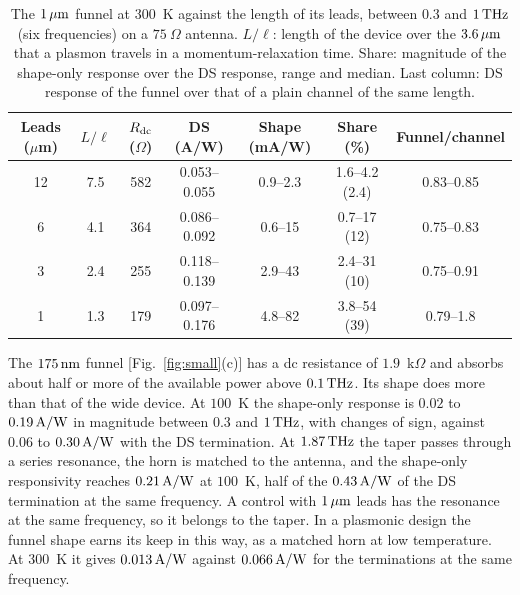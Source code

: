 \begin{table}
\caption{The $1\,\mu\mathrm{m}$ funnel at $300$~K against the length of its leads,
between $0.3$ and $1\,\mathrm{THz}$ (six frequencies) on a $75\ \Omega$ antenna.
$L/\ell$: length of the device over the $3.6\,\mu\mathrm{m}$ that a plasmon travels
in a momentum-relaxation time. Share: magnitude of the shape-only
response over the DS response, range and median. Last column: DS
response of the funnel over that of a plain channel of the same length.}
\label{tab:leads}
\begin{ruledtabular}
\begin{tabular}{ccccccc}
Leads ($\mu$m) & $L/\ell$ & $R_{\mathrm{dc}}$ ($\Omega$) & DS (A/W) & Shape (mA/W) & Share (\%) & Funnel/channel \\
\hline
12 & 7.5 & 582 & 0.053--0.055 & 0.9--2.3 & 1.6--4.2 (2.4) & 0.83--0.85 \\
6 & 4.1 & 364 & 0.086--0.092 & 0.6--15 & 0.7--17 (12) & 0.75--0.83 \\
3 & 2.4 & 255 & 0.118--0.139 & 2.9--43 & 2.4--31 (10) & 0.75--0.91 \\
1 & 1.3 & 179 & 0.097--0.176 & 4.8--82 & 3.8--54 (39) & 0.79--1.8 \\
\end{tabular}
\end{ruledtabular}
\end{table}

The $175\,\mathrm{nm}$ funnel [Fig.~\ref{fig:small}(c)] has a dc resistance of
$1.9$~k$\Omega$ and absorbs about half or more of the available power
above $0.1\,\mathrm{THz}$. Its shape does more than that of the wide device. At
$100$~K the shape-only response is $0.02$ to $0.19\,\mathrm{A/W}$ in magnitude
between $0.3$ and $1\,\mathrm{THz}$, with changes of sign, against $0.06$ to
$0.30\,\mathrm{A/W}$ with the DS termination. At $1.87\,\mathrm{THz}$ the taper passes through
a series resonance, the horn is matched to the antenna, and the
shape-only responsivity reaches $0.21\,\mathrm{A/W}$ at $100$~K, half of the
$0.43\,\mathrm{A/W}$ of the DS termination at the same frequency. A control with
$1\,\mu\mathrm{m}$ leads has the resonance at the same frequency, so it belongs to
the taper. In a plasmonic design the funnel shape earns its keep in this
way, as a matched horn at low temperature. At $300$~K it gives
$0.013\,\mathrm{A/W}$ against $0.066\,\mathrm{A/W}$ for the terminations at the same frequency.

